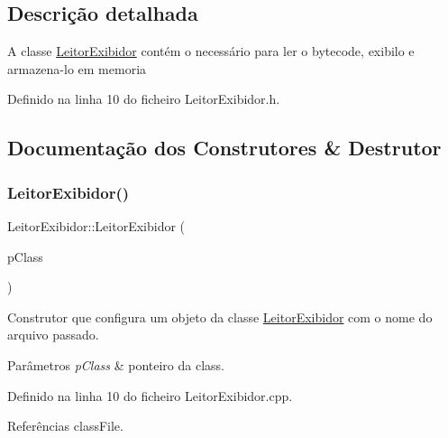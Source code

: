 \subsection{Descrição detalhada}
A classe \hyperlink{classLeitorExibidor}{Leitor\+Exibidor} contém o necessário para ler o bytecode, exibilo e armazena-\/lo em memoria 

Definido na linha 10 do ficheiro Leitor\+Exibidor.\+h.



\subsection{Documentação dos Construtores \& Destrutor}
\mbox{\label{classLeitorExibidor_a3a925accb2da9a51859f02005737e58f}} 
\subsubsection{\texorpdfstring{Leitor\+Exibidor()}{LeitorExibidor()}\hspace{0.1cm}{\footnotesize\ttfamily [1/2]}}
{\footnotesize\ttfamily Leitor\+Exibidor\+::\+Leitor\+Exibidor (\begin{DoxyParamCaption}\item[{\hyperlink{classClassFile}{Class\+File} $\ast$}]{p\+Class }\end{DoxyParamCaption})}



Construtor que configura um objeto da classe \hyperlink{classLeitorExibidor}{Leitor\+Exibidor} com o nome do arquivo passado. 


\begin{DoxyParams}{Parâmetros}
{\em p\+Class} & ponteiro da class. \\
\hline
\end{DoxyParams}


Definido na linha 10 do ficheiro Leitor\+Exibidor.\+cpp.



Referências class\+File.

\mbox{\label{classLeitorExibidor_a246be764c0b6895539f915cc0f813e7b}} 
